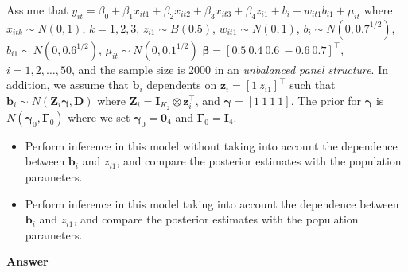 \begin{enumerate}[leftmargin=*]
Assume that $y_{it}=\beta_0+\beta_1x_{it1}+\beta_2x_{it2}+\beta_3x_{it3}+\beta_4 z_{i1}+b_i+w_{it1}b_{i1}+\mu_{it}$ where $x_{itk}\sim N(0,1)$, $k=1,2,3$, $z_{i1}\sim B(0.5)$, $w_{it1}\sim N(0,1)$, $b_i\sim N(0, 0.7^{1/2})$, $b_{i1}\sim N(0, 0.6^{1/2})$, $\mu_{it}\sim N(0, 0.1^{1/2})$ $\bm{\beta}=[0.5 \ 0.4 \ 0.6 \ -0.6 \ 0.7]^{\top}$, $i=1,2,\dots,50$, and the sample size is 2000 in an \textit{unbalanced panel structure}. In addition, we assume that $\bm{b}_i$ dependents on $\bm{z}_i=[1 \ z_{i1}]^{\top}$ such that $\bm{b}_i\sim N(\bm{Z}_i\bm{\gamma},\bm{D})$ where $\bm{Z}_i=\bm{I}_{K_2}\otimes \bm{z}_i^{\top}$, and $\bm{\gamma}=[1 \ 1 \ 1 \ 1]$. The prior for $\bm{\gamma}$ is $N(\bm{\gamma}_0,\bm{\Gamma}_0)$ where we set $\bm{\gamma}_0=\bm{0}_4$ and $\bm{\Gamma}_0=\bm{I}_4$. 
	\begin{itemize}
	\item Perform inference in this model without taking into account the dependence between $\bm{b}_i$ and $z_{i1}$, and compare the posterior estimates with the population parameters.
	\item Perform inference in this model taking into account the dependence between $\bm{b}_i$ and $z_{i1}$, and compare the posterior estimates with the population parameters. 
\end{itemize}

\textbf{Answer}


\end{enumerate}
